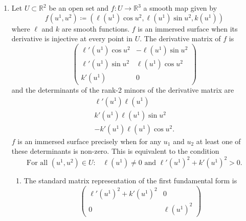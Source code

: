 \documentclass[a4paper, 12pt]{article}
\newcommand{\R}{\mathbb{R}}
\begin{document}
\begin{enumerate}
\item Let \(U\subset\R^2\) be an open set and \(f\colon U\to\R^3\) a smooth map given by
\[f(u^1,u^2)\coloneqq(\ell(u^1)\cos u^2,\ell(u^1)\sin u^2,k(u^1))\]
where \(\ell\) and \(k\) are smooth functions. \(f\) is an immersed surface when its derivative is injective at every point in \(U\). The derivative matrix of \(f\) is
\[\begin{pmatrix}
\ell'(u^1)\cos u^2&-\ell(u^1)\sin u^2\\
\ell'(u^1)\sin u^2&\ell(u^1)\cos u^2\\
k'(u^1)&0
\end{pmatrix}\]
and the determinants of the rank-2 minors of the derivative matrix are
\begin{gather*}
\ell'(u^1)\ell(u^1)\\
k'(u^1)\ell(u^1)\sin u^2\\
-k'(u^1)\ell(u^1)\cos u^2.
\end{gather*}
\(f\) is an immersed surface precisely when for any \(u_1\) and \(u_2\) at least one of these determinants is non-zero. This is equivalent to the condition
\[\text{For all \((u^1,u^2)\in U\):}\quad\ell(u^1)\neq0\text{ and }\ell'(u^1)^2+k'(u^1)^2>0.\]

\begin{enumerate}

\item The standard matrix representation of the first fundamental form is
\[\begin{pmatrix}
\ell'(u^1)^2+k'(u^1)^2&0\\
0&\ell(u^1)^2
\end{pmatrix}\]


\end{enumerate}
\end{enumerate}
\end{document}
